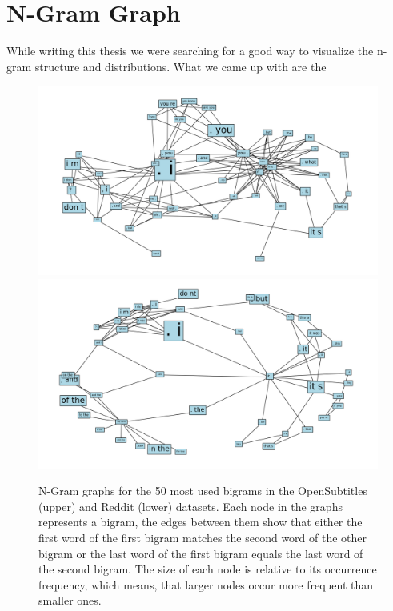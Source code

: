 \section{N-Gram Graph}

While writing this thesis we were searching for a good way to visualize the n-gram structure and distributions. What we came up with are the 

\begin{figure}[H]
	\includegraphics[width=\linewidth]{img/opensubtitles_bigram_top_50_graph}
	\centering
	\small
	\endminipage\hfill
	\includegraphics[width=\linewidth]{img/reddit_bigram_top_50_graph}
	\centering
	\small
	\endminipage\hfill
	\caption{N-Gram graphs for the 50 most used bigrams in the OpenSubtitles (upper) and Reddit (lower) datasets. Each node in the graphs represents a bigram, the edges between them show that either the first word of the first bigram matches the second word of the other bigram or the last word of the first bigram equals the last word of the second bigram. The size of each node is relative to its occurrence frequency, which means, that larger nodes occur more frequent than smaller ones.}
	\label{data:ngram:graph_top_50}
\end{figure}